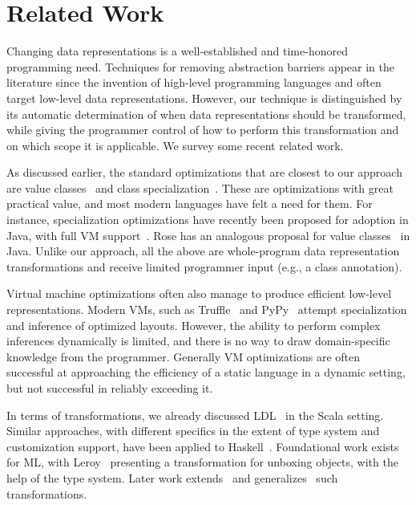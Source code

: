 \section{Related Work}
\label{sec:related}


Changing data representations is a well-established and time-honored
programming need. Techniques for removing abstraction barriers appear
in the literature since the invention of high-level programming
languages and often target low-level data representations. However,
our technique is distinguished by its automatic determination of when
data representations should be transformed, while giving the
programmer control of how to perform this transformation and on which
scope it is applicable. We survey some recent related work.

As discussed earlier, the standard optimizations that are closest to
our approach are value classes~\cite{sip-value-classes} and class
specialization~\cite{iuli-thesis,miniboxing}. These are optimizations
with great practical value, and most modern languages have felt a need
for them. For instance, specialization optimizations have recently
been proposed for adoption in Java, with full VM
support~\cite{goetz-specialization}. Rose has an analogous proposal
for value
classes~\cite{rose-value-classes-vm,rose-value-classes-tearing} in
Java. Unlike our approach, all the above are whole-program data
representation transformations and receive limited programmer input
(e.g., a class annotation).

Virtual machine optimizations often also manage to produce efficient
low-level representations. Modern VMs, such as
Truffle~\cite{Wurthinger:2013:OVR:2509578.2509581} and
PyPy~\cite{PyPyTracing} attempt specialization and inference of
optimized layouts. However, the ability to perform complex inferences
dynamically is limited, and there is no way to draw domain-specific
knowledge from the programmer. Generally VM optimizations are often
successful at approaching the efficiency of a static language in a
dynamic setting, but not successful in reliably exceeding it.

In terms of transformations, we already discussed LDL~\cite{ldl} in
the Scala setting. Similar approaches, with different specifics in the
extent of type system and customization support, have been applied to
Haskell~\cite{spj-unboxed-values}. Foundational work exists for ML,
with Leroy~\cite{leroy-unboxed-objects} presenting a transformation
for unboxing objects, with the help of the type system. Later work
extends~\cite{thiemann-unboxed-objects-cps} and
generalizes~\cite{shao-flexible-representation-analysis} such
transformations.

